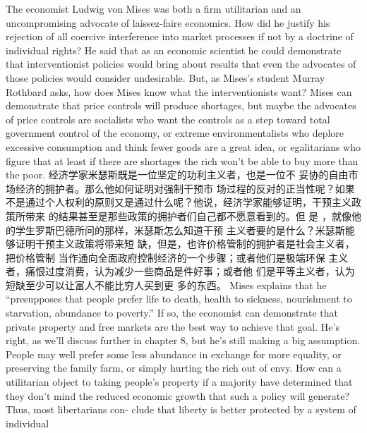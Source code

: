 \begin{paracol}{2}

The economist Ludwig von Mises was both a firm utilitarian
and an uncompromising advocate of laissez-faire economics.
How did he justify his rejection of all coercive interference into
market processes if not by a doctrine of individual rights? He
said that as an economic scientist he could demonstrate that interventionist policies would bring about results that even the
advocates of those policies would consider undesirable. But, as
Mises's student Murray Rothbard asks, how does Mises know
what the interventionists want? Mises can demonstrate that
price controls will produce shortages, but maybe the advocates
of price controls are socialists who want the controls as a step
toward total government control of the economy, or extreme
environmentalists who deplore excessive consumption and
think fewer goods are a great idea, or egalitarians who figure
that at least if there are shortages the rich won't be able to buy
more than the poor.
\switchcolumn
经济学家米瑟斯既是一位坚定的功利主义者，也是一位不
妥协的自由市场经济的拥护者。那么他如何证明对强制干预市
场过程的反对的正当性呢？如果不是通过个人权利的原则又是通过什么呢？他说，经济学家能够证明，干预主义政策所带来
的结果甚至是那些政策的拥护者们自己都不愿意看到的。但
是 ，就像他的学生罗斯巴德所问的那样，米瑟斯怎么知道干预
主义者要的是什么？米瑟斯能够证明干预主义政策将带来短
缺，但是，也许价格管制的拥护者是社会主义者，把价格管制
当作通向全面政府控制经济的一个步骤；或者他们是极端环保
主义者，痛恨过度消费，认为减少一些商品是件好事；或者他
们是平等主义者，认为短缺至少可以让富人不能比穷人买到更
多的东西。
\switchcolumn*
Mises explains that he ``presupposes that people prefer life to
death, health to sickness, nourishment to starvation, abundance
to poverty.'' If so, the economist can demonstrate that private
property and free markets are the best way to achieve that goal.
He's right, as we'll discuss further in chapter 8, but he's still
making a big assumption. People may well prefer some less
abundance in exchange for more equality, or preserving the
family farm, or simply hurting the rich out of envy. How can a
utilitarian object to taking people's property if a majority have
determined that they don't mind the reduced economic growth that such a policy will generate? Thus, most libertarians con-
clude that liberty is better protected by a system of individual

\end{paracol}

